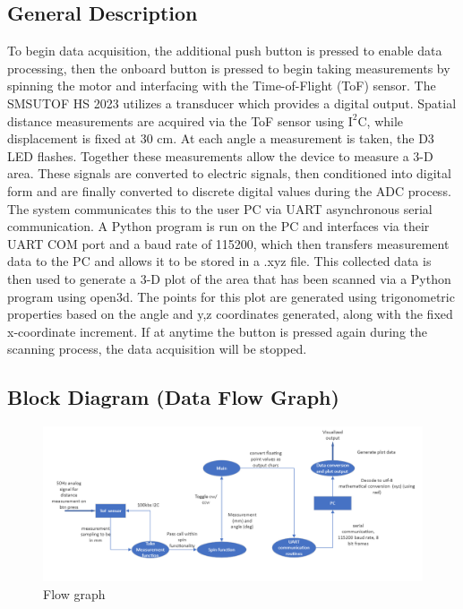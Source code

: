 \documentclass[12pt, letterpaper]{article}
\begin{document}
\subsection{General Description}
To begin data acquisition, the additional push button is pressed to enable data processing, then the onboard button is pressed to begin taking measurements by spinning the motor and interfacing with the Time-of-Flight (ToF) sensor. The SMSUTOF HS 2023 utilizes a transducer which provides a digital output. Spatial distance measurements are acquired via the ToF sensor using $\mathrm{I^2C}$, while displacement is fixed at 30 cm. At each angle a measurement is taken, the D3 LED flashes. Together these measurements allow the device to measure a 3-D area. These signals are converted to electric signals, then conditioned into digital form and are finally converted to discrete digital values during the ADC process. The system communicates this to the user PC via UART asynchronous serial communication. A Python program is run on the PC and interfaces via their UART COM port and a baud rate of 115200, which then transfers measurement data to the PC and allows it to be stored in a .xyz file. This collected data is then used to generate a 3-D plot of the area that has been scanned via a Python program using open3d. The points for this plot are generated using trigonometric properties based on the angle and y,z coordinates generated, along with the fixed x-coordinate increment. If at anytime the button is pressed again during the scanning process, the data acquisition will be stopped. 
\subsection{Block Diagram (Data Flow Graph)}
\begin{figure}[h]
    \centering
    \includegraphics[width=\textwidth]{images/flowgraph.png}
    \caption{Flow graph}
    \label{fig:flowgraph}
\end{figure}
\end{document}
